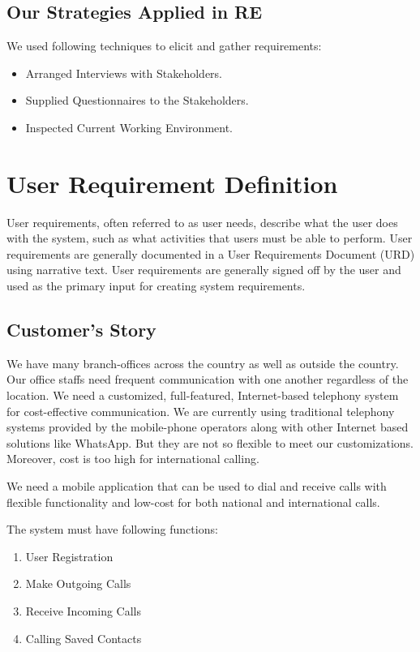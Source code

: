 \subsection{Our Strategies Applied in RE}
We used following techniques to elicit and gather requirements:
\begin{itemize}
 \item Arranged Interviews with Stakeholders.
 \item Supplied Questionnaires to the Stakeholders.
 \item Inspected Current Working Environment.
\end{itemize}
\clearpage

\section{User Requirement Definition}
User requirements, often referred to as user needs, describe what the user does with the system, such as what activities that users must be able to perform. User requirements are generally documented in a User Requirements Document (URD) using narrative text. User requirements are generally signed off by the user and used as the primary input for creating system requirements.

\subsection{Customer's Story}
We have many branch-offices across the country as well as outside the country. Our office staffs need frequent communication with one another regardless of the location. We need a customized, full-featured, Internet-based telephony system for cost-effective communication. We are currently using traditional telephony systems provided by the mobile-phone operators along with other Internet based solutions like WhatsApp. But they are not so flexible to meet our customizations. Moreover, cost is too high for international calling.

We need a mobile application that can be used to dial and receive calls with flexible functionality and low-cost for both national and international calls.

The system must have following functions:
\begin{enumerate}
 \item User Registration
 \item Make Outgoing Calls
 \item Receive Incoming Calls
 \item Calling Saved Contacts
\end{enumerate}

